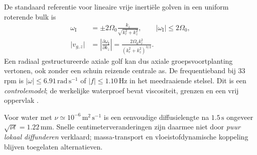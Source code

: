 \documentclass[10pt,a4paper]{article}
\begin{document}
De standaard referentie voor lineaire vrije inertiële golven in een uniform roterende bulk is
\begin{align}
\omega_{\mathrm I}&=\pm2\Omega_0\frac{k_z}{\sqrt{k_r^2+k_z^2}},\qquad
\big|\omega_{\mathrm I}\big|\leq2\Omega_0,\\
\big|v_{g,z}\big|&=\left|\frac{\partial\omega_{\mathrm I}}{\partial k_z}\right|
=\frac{2\Omega_0 k_r^2}{(k_r^2+k_z^2)^{3/2}}.
\end{align}
Een radiaal gestructureerde axiale golf kan dus axiale groepsvoortplanting vertonen, ook zonder een schuin reizende centrale as. De frequentieband bij 33 rpm is $|\omega|\leq6.91\,\mathrm{rad\,s^{-1}}$ of $|f|\leq1.10\,\mathrm{Hz}$ in het meedraaiende stelsel. Dit is een \emph{controlemodel}; de werkelijke waterproef bevat viscositeit, grenzen en een vrij oppervlak \cite{Greenspan1968,Yang2020}.

Voor water met $\nu\simeq10^{-6}\,\mathrm{m^2\,s^{-1}}$ is een eenvoudige diffusielengte na $1.5\,\mathrm s$ ongeveer $\sqrt{\nu t}=1.22\,\mathrm{mm}$. Snelle centimeterveranderingen zijn daarmee niet door \emph{puur lokaal diffunderen} verklaard; massa-transport en vloeistofdynamische koppeling blijven toegelaten alternatieven.
\end{document}
